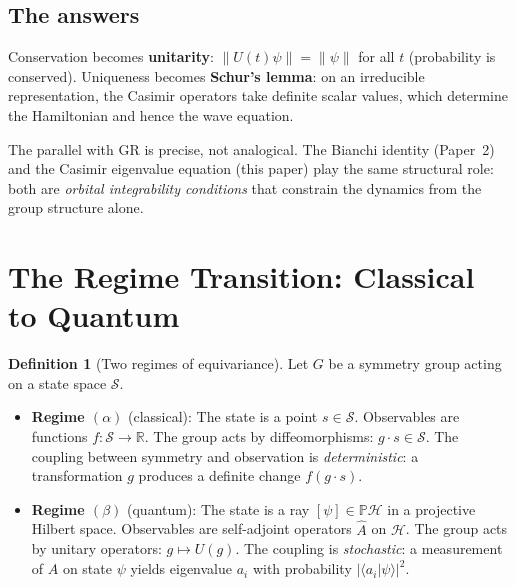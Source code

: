 \documentclass[12pt]{article}
\theoremstyle{plain}
\theoremstyle{definition}
\newtheorem{definition}[theorem]{Definition}
\theoremstyle{remark}
\begin{document}
\subsection{The answers}

Conservation becomes \textbf{unitarity}: $\|U(t)\psi\| = \|\psi\|$ for all $t$ (probability is conserved). Uniqueness becomes \textbf{Schur's lemma}: on an irreducible representation, the Casimir operators take definite scalar values, which determine the Hamiltonian and hence the wave equation.

The parallel with GR is precise, not analogical. The Bianchi identity (Paper~2) and the Casimir eigenvalue equation (this paper) play the same structural role: both are \emph{orbital integrability conditions} that constrain the dynamics from the group structure alone.


\section{The Regime Transition: Classical to Quantum}
\label{sec:regime}

\begin{definition}[Two regimes of equivariance]\label{def:regimes}
Let $G$ be a symmetry group acting on a state space $\mathcal{S}$.
\begin{itemize}
    \item \textbf{Regime $(\alpha)$} (classical): The state is a point $s \in \mathcal{S}$. Observables are functions $f: \mathcal{S} \to \mathbb{R}$. The group acts by diffeomorphisms: $g \cdot s \in \mathcal{S}$. The coupling between symmetry and observation is \emph{deterministic}: a transformation $g$ produces a definite change $f(g \cdot s)$.
    \item \textbf{Regime $(\beta)$} (quantum): The state is a ray $[\psi] \in \mathbb{P}\mathcal{H}$ in a projective Hilbert space. Observables are self-adjoint operators $\hat{A}$ on $\mathcal{H}$. The group acts by unitary operators: $g \mapsto U(g)$. The coupling is \emph{stochastic}: a measurement of $\hat{A}$ on state $\psi$ yields eigenvalue $a_i$ with probability $|\langle a_i|\psi\rangle|^2$.
\end{itemize}
\end{definition}
\end{document}
